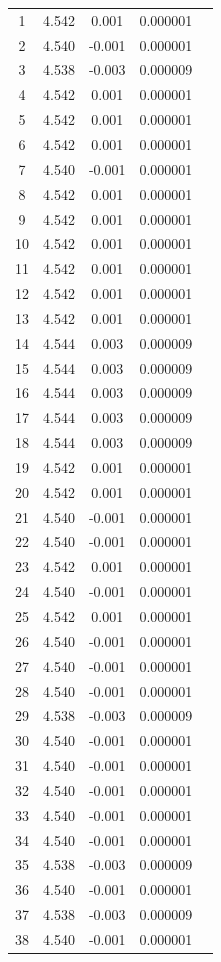 \begin{center}
\begin{table}[H]
\begin{tabular}{|c|c|c|c|c|}
1  &    4.542  &  0.001 & 0.000001 \\
2  &    4.540  &  -0.001 & 0.000001 \\
3 &  4.538  &  -0.003 & 0.000009 \\
4 &  4.542  &   0.001 & 0.000001 \\
5 &  4.542  &  0.001 & 0.000001 \\
6 &  4.542  &  0.001 & 0.000001 \\
7 &  4.540  &  -0.001 & 0.000001 \\
8 &  4.542  &  0.001 & 0.000001 \\
9 &  4.542  &  0.001 & 0.000001 \\
10 &  4.542  &  0.001 & 0.000001 \\
11 &  4.542  &  0.001 & 0.000001 \\
12 &  4.542  &  0.001 & 0.000001 \\
13 &  4.542  &  0.001 & 0.000001 \\
14 &  4.544  &  0.003 & 0.000009 \\
15 &  4.544  &  0.003 & 0.000009 \\
16 &  4.544  &  0.003 & 0.000009 \\
17 &  4.544  &  0.003 & 0.000009 \\
18 &  4.544  &  0.003 & 0.000009 \\
19 &  4.542  &  0.001 & 0.000001 \\
20 &  4.542  &  0.001 & 0.000001 \\
21 &  4.540  &  -0.001 & 0.000001 \\
22 &  4.540  &  -0.001 & 0.000001 \\
23 &  4.542  &  0.001 & 0.000001 \\
24 &  4.540  &  -0.001 & 0.000001 \\
25 &  4.542  &  0.001 & 0.000001 \\
26 &  4.540  &  -0.001 & 0.000001 \\
27 &  4.540  &  -0.001 & 0.000001 \\
28 &  4.540  &  -0.001 & 0.000001 \\
29 &  4.538  &  -0.003 & 0.000009 \\
30 &  4.540  &  -0.001 & 0.000001 \\
31 &  4.540  &  -0.001 & 0.000001 \\
32 &  4.540  &  -0.001 & 0.000001 \\
33 &  4.540  &  -0.001 & 0.000001 \\
34 &  4.540  &  -0.001 & 0.000001 \\
35 &  4.538  &  -0.003 & 0.000009 \\
36 &  4.540  &  -0.001 & 0.000001 \\
37 &  4.538  &  -0.003 & 0.000009 \\
38 &  4.540  &  -0.001 & 0.000001 \\
\hline
\end{tabular}
\end{table}
\end{center}
